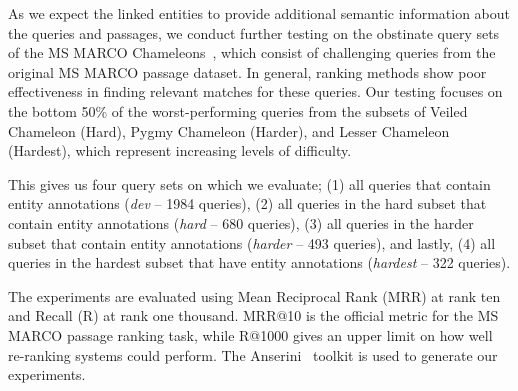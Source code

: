 As we expect the linked entities to provide additional semantic information about the queries and passages, we conduct further testing on the obstinate query sets of the MS MARCO Chameleons~\citep{chameleons}, which consist of challenging queries from the original MS MARCO passage dataset. In general, ranking methods show poor effectiveness in finding relevant matches for these queries. Our testing focuses on the bottom 50\% of the worst-performing queries from the subsets of Veiled Chameleon (Hard), Pygmy Chameleon (Harder), and Lesser Chameleon (Hardest), which represent increasing levels of difficulty. 

This gives us four query sets on which we evaluate; (1) all queries that contain entity annotations (\emph{dev} -- 1984 queries), (2) all queries in the hard subset that contain entity annotations (\emph{hard} -- 680 queries), (3) all queries in the harder subset that contain entity annotations (\emph{harder} -- 493 queries), and lastly, (4) all queries in the hardest subset that have entity annotations (\emph{hardest} -- 322 queries).

The experiments are evaluated using Mean Reciprocal Rank (MRR) at rank ten and Recall (R) at rank one thousand. MRR@10 is the official metric for the MS MARCO passage ranking task, while R@1000 gives an upper limit on how well re-ranking systems could perform. The Anserini~\citep{anserini} toolkit is used to generate our experiments. 

